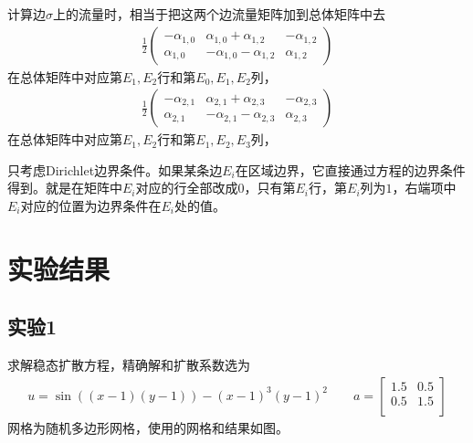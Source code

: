 \documentclass[12pt,a4paper]{article}
\theoremstyle{plain}
\begin{document}
计算边$\sigma$上的流量时，相当于把这两个边流量矩阵加到总体矩阵中去
\begin{align*}
\frac12
\left(
\begin{matrix}
-\alpha_{1,0} & \alpha_{1,0} + \alpha_{1,2} & - \alpha_{1,2} \\
\alpha_{1,0} & -\alpha_{1,0} - \alpha_{1,2} & \alpha_{1,2} 
\end{matrix}
\right)
\end{align*}
在总体矩阵中对应第$E_1, E_2$行和第$E_0, E_1, E_2$列，
\begin{align*}
\frac12
\left(
\begin{matrix}
-\alpha_{2,1} & \alpha_{2,1} + \alpha_{2,3} & - \alpha_{2,3} \\
\alpha_{2,1} & -\alpha_{2,1} - \alpha_{2,3} & \alpha_{2,3} 
\end{matrix}
\right)
\end{align*}
在总体矩阵中对应第$E_1, E_2$行和第$E_1, E_2, E_3$列，


只考虑Dirichlet边界条件。如果某条边$E_i$在区域边界，它直接通过方程的边界条件得到。就是在矩阵中$E_i$对应的行全部改成0，只有第$E_i$行，第$E_i$列为$1$，右端项中$E_i$对应的位置为边界条件在$E_i$处的值。


\section*{实验结果}

\subsection*{实验1}

求解稳态扩散方程，精确解和扩散系数选为
\begin{align*}
u = \sin((x-1)(y-1)) - (x-1)^3 (y-1)^2 \qquad
a = \left[
\begin{matrix}
1.5 & 0.5 \\
0.5 & 1.5 \\
\end{matrix}
\right]
\end{align*}
网格为随机多边形网格，使用的网格和结果如图。
\end{document}
